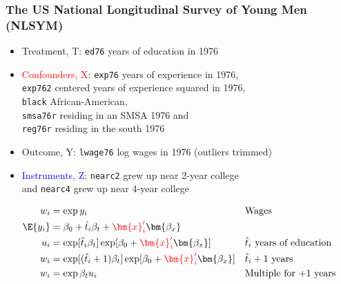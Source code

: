 \documentclass[11pt,pdftex,dvipsnames,usenames,helvetica]{beamer}
\begin{document}
\begin{frame}[fragile]
\frametitle{The US National Longitudinal Survey of Young Men
     (NLSYM)}

\begin{itemize}
\item Treatment, T: {\tt ed76} years of education in 1976
\item \textcolor{red}{Confounders, X}: 
{\tt exp76} years of experience in 1976,\\
{\tt exp762} centered years of experience squared in 1976,\\
{\tt black} African-American,\\
{\tt smsa76r} residing in an SMSA 1976 and\\ 
{\tt reg76r} residing in the south 1976
\item Outcome, Y: {\tt lwage76} log wages in 1976 (outliers trimmed)
\item \textcolor{blue}{Instruments, Z}:
 {\tt nearc2} grew up near 2-year college\\
and {\tt nearc4} grew up near 4-year college
\end{itemize}
\begin{align*}
w_i & = \exp y_i & & \mbox{Wages} \\
\E{y_i} & = \beta_0 + \hat{t}_i \beta_t+ \textcolor{red}{\bm{x}_i'}\bm{\beta_x} \\
 u_{i} & = \exp [\hat{t}_i \beta_t] \exp[\beta_0 + \textcolor{red}{\bm{x}_i'}\bm{\beta_x}]  & & \mbox{$\hat{t}_i$ years of education} \\
 w_{i} & = \exp [(\hat{t}_i+1) \beta_t] \exp[\beta_0 + \textcolor{red}{\bm{x}_i'}\bm{\beta_x}]  & & \mbox{$\hat{t}_i+1$ years} \\
{w_{i}} & = \exp  \beta_t {u_{i}} & & \mbox{Multiple for $+1$ years}
\end{align*}
\end{frame}
\end{document}
